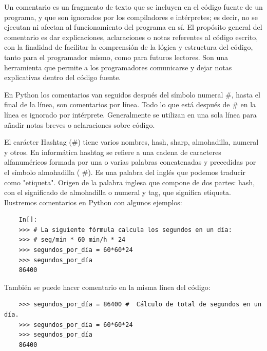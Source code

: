 Un comentario es un fragmento de texto que se incluyen en el código fuente de un programa, y que son ignorados por los compiladores e intérpretes; es decir, no se ejecutan ni afectan al funcionamiento del programa en sí. El propósito general del comentario es dar explicaciones, aclaraciones o notas referentes al código escrito, con la finalidad de facilitar la comprensión de la lógica y estructura del código, tanto para el programador mismo,  como para futuros lectores. Son una herramienta que permite a los programadores comunicarse y dejar notas explicativas dentro del código fuente.


En Python los comentarios van seguidos después del símbolo numeral {\ttfamily \#}, hasta el final de la línea, son comentarios por línea. Todo lo que está después de {\ttfamily \#} en la línea  es ignorado por intérprete.  Generalmente se utilizan en una sola línea para añadir notas breves o aclaraciones sobre código. 

El carácter Hashtag ({\ttfamily \#}) tiene varios nombres, hash, sharp, almohadilla, numeral y otros. En informática hashtag se refiere a una cadena de caracteres alfanuméricos formada por una o varias palabras concatenadas y precedidas por el símbolo almohadilla ( {\ttfamily \#}). Es una palabra del inglés que podemos traducir como "etiqueta". Origen de la palabra inglesa que compone de dos partes: hash, con el significado de almohadilla o numeral y tag, que significa etiqueta.  \\ 


Ilustremos comentarios en Python con algunos ejemplos:
\begin{lstlisting}
	In[]:		
	>>> # La siguiente fórmula calcula los segundos en un día:
	>>> # seg/min * 60 min/h * 24
	>>> segundos_por_día = 60*60*24
	>>> segundos_por_día
	86400
\end{lstlisting}	

También se puede hacer comentario en la misma línea del código:  

\begin{lstlisting}
	>>> segundos_por_día = 86400 #  Cálculo de total de segundos en un día.
	>>> segundos_por_día = 60*60*24
	>>> segundos_por_día
	86400
\end{lstlisting}



